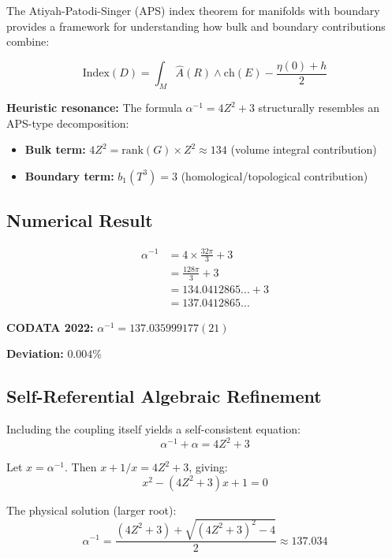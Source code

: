 \documentclass[12pt,a4paper]{article}
\newcommand{\Zsq}{Z^2}
\begin{document}
The Atiyah-Patodi-Singer (APS) index theorem for manifolds with boundary provides a framework for understanding how bulk and boundary contributions combine:

\begin{equation}
\text{Index}(D) = \int_M \hat{A}(R) \wedge \text{ch}(E) - \frac{\eta(0) + h}{2}
\end{equation}

\textbf{Heuristic resonance:} The formula $\alpha^{-1} = 4\Zsq + 3$ structurally resembles an APS-type decomposition:
\begin{itemize}
    \item \textbf{Bulk term:} $4\Zsq = \text{rank}(G) \times \Zsq \approx 134$ (volume integral contribution)
    \item \textbf{Boundary term:} $b_1(T^3) = 3$ (homological/topological contribution)
\end{itemize}

\subsection{Numerical Result}

\begin{align}
\alpha^{-1} &= 4 \times \frac{32\pi}{3} + 3 \\
&= \frac{128\pi}{3} + 3 \\
&= 134.0412865... + 3 \\
&= 137.0412865...
\end{align}

\textbf{CODATA 2022:} $\alpha^{-1} = 137.035999177(21)$

\textbf{Deviation:} $0.004\%$

\subsection{Self-Referential Algebraic Refinement}

Including the coupling itself yields a self-consistent equation:
\begin{equation}
\alpha^{-1} + \alpha = 4\Zsq + 3
\end{equation}

Let $x = \alpha^{-1}$. Then $x + 1/x = 4\Zsq + 3$, giving:
\begin{equation}
x^2 - (4\Zsq + 3)x + 1 = 0
\end{equation}

The physical solution (larger root):
\begin{equation}
\alpha^{-1} = \frac{(4\Zsq + 3) + \sqrt{(4\Zsq + 3)^2 - 4}}{2} \approx 137.034
\end{equation}
\end{document}
